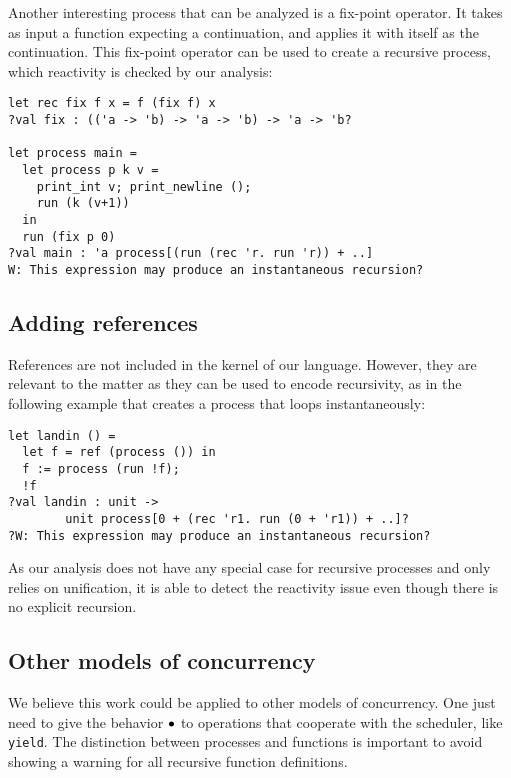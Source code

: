 \documentclass[9pt,preprint]{sigplanconf}
\begin{document}
Another interesting process that can be analyzed is a fix-point operator. It takes as input a function expecting a continuation, and applies it with itself as the continuation. This fix-point operator can be used to create a recursive process, which reactivity is checked by our analysis:
\begin{lstlisting}
let rec fix f x = f (fix f) x
?val fix : (('a -> 'b) -> 'a -> 'b) -> 'a -> 'b?

let process main =
  let process p k v =
    print_int v; print_newline (); 
    run (k (v+1))
  in
  run (fix p 0)
?val main : 'a process[(run (rec 'r. run 'r)) + ..]
W: This expression may produce an instantaneous recursion?
\end{lstlisting}

\subsection{Adding references}

References are not included in the kernel of our language. However, they are relevant to the matter as they can be used to encode recursivity, as in the following example that creates a process that loops instantaneously:
%
\begin{lstlisting}
let landin () =
  let f = ref (process ()) in
  f := process (run !f);
  !f
?val landin : unit -> 
        unit process[0 + (rec 'r1. run (0 + 'r1)) + ..]?
?W: This expression may produce an instantaneous recursion?
\end{lstlisting}
%
As our analysis does not have any special case for recursive processes and only relies on unification, it is able to detect the reactivity issue even though there is no explicit recursion.

\subsection{Other models of concurrency}
\label{sec:other_concurrency}

We believe this work could be applied to other models of concurrency. One just need to give the behavior $\bullet$ to operations that cooperate with the scheduler, like \texttt{yield}. The distinction between processes and functions is important to avoid showing a warning for all recursive function definitions.
\end{document}
